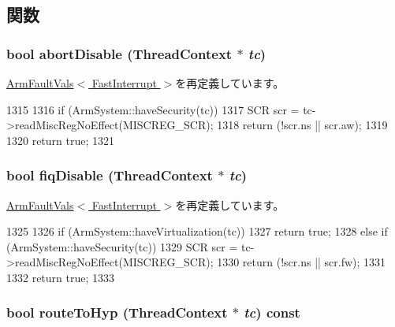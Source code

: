 \subsection{関数}
\hypertarget{classArmISA_1_1FastInterrupt_a92a741baab278ed029d84b0fe979e1b8}{
\subsubsection[{abortDisable}]{\setlength{\rightskip}{0pt plus 5cm}bool abortDisable ({\bf ThreadContext} $\ast$ {\em tc})}}
\label{classArmISA_1_1FastInterrupt_a92a741baab278ed029d84b0fe979e1b8}


\hyperlink{classArmISA_1_1ArmFaultVals_a1f1a5b662b9a505415dd5ef1f52892f3}{ArmFaultVals$<$ FastInterrupt $>$}を再定義しています。


\begin{DoxyCode}
1315 {
1316     if (ArmSystem::haveSecurity(tc)) {
1317         SCR scr = tc->readMiscRegNoEffect(MISCREG_SCR);
1318         return (!scr.ns || scr.aw);
1319     }
1320     return true;
1321 }
\end{DoxyCode}
\hypertarget{classArmISA_1_1FastInterrupt_a5f03475ae417a13eb48c2593f9f5b5a6}{
\subsubsection[{fiqDisable}]{\setlength{\rightskip}{0pt plus 5cm}bool fiqDisable ({\bf ThreadContext} $\ast$ {\em tc})}}
\label{classArmISA_1_1FastInterrupt_a5f03475ae417a13eb48c2593f9f5b5a6}


\hyperlink{classArmISA_1_1ArmFaultVals_a554b3d306d50e92e5d8102124be41fe7}{ArmFaultVals$<$ FastInterrupt $>$}を再定義しています。


\begin{DoxyCode}
1325 {
1326     if (ArmSystem::haveVirtualization(tc)) {
1327         return true;
1328     } else if (ArmSystem::haveSecurity(tc)) {
1329         SCR scr = tc->readMiscRegNoEffect(MISCREG_SCR);
1330         return (!scr.ns || scr.fw);
1331     }
1332     return true;
1333 }
\end{DoxyCode}
\hypertarget{classArmISA_1_1FastInterrupt_a16facd13ba8e6d15d2b865882c379d5f}{
\subsubsection[{routeToHyp}]{\setlength{\rightskip}{0pt plus 5cm}bool routeToHyp ({\bf ThreadContext} $\ast$ {\em tc}) const}}
\label{classArmISA_1_1FastInterrupt_a16facd13ba8e6d15d2b865882c379d5f}


